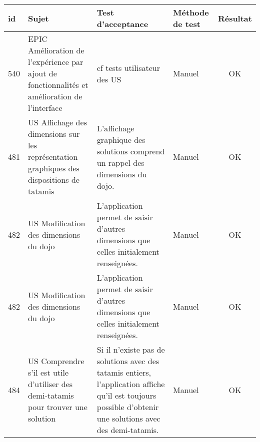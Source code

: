 \noindent%
\begin{adjustwidth}{-1.5cm}{0cm}

    \renewcommand{\arraystretch}{1.2}
    {\setlength{\tabcolsep}{1.5 mm}
        \begin{tabular}{|m{0.6cm}|m{5.5cm}|m{8cm}|m{2cm}|c|} \hline
            id  & Sujet                                                                                                              & Test d'acceptance                                                                                                                                                                                                                  & Méthode de test & Résultat \\ \hline
            540 & EPIC Amélioration de l'expérience par ajout de fonctionnalités et amélioration de l'interface                      & \cellcolor{tsgrey}cf tests utilisateur des US                                                                                                                                                                                                        & Manuel          & OK       \\ \hline
            481 & US Affichage des dimensions sur les représentation graphiques des dispositions de tatamis                          & L'affichage graphique des solutions comprend un rappel des dimensions du dojo.                                                                                                                                                     & Manuel          & OK       \\ \hline
            482 & US Modification des dimensions du dojo                                                                             & L'application permet de saisir d'autres dimensions que celles initialement renseignées.                                                                                                                                            & Manuel          & OK       \\ \hline
            482 & US Modification des dimensions du dojo                                                                             & L'application permet de saisir d'autres dimensions que celles initialement renseignées.                                                                                                                                            & Manuel          & OK       \\ \hline
            484 & US Comprendre s'il est utile d'utiliser des demi-tatamis pour trouver une solution                                 & Si il n'existe pas de solutions avec des tatamis entiers, l'application affiche qu'il est toujours possible d'obtenir une solutions avec des demi-tatamis.                                                                         & Manuel          & OK       \\ \hline

\end{tabular}}
\end{adjustwidth}

